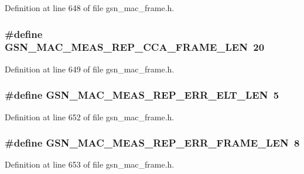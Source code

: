 Definition at line 648 of file gsn\_\-mac\_\-frame.h.

\hypertarget{a00523_ad28ce435f895e4eb008cbe50d0bd06f8}{
\subsubsection[{GSN\_\-MAC\_\-MEAS\_\-REP\_\-CCA\_\-FRAME\_\-LEN}]{\setlength{\rightskip}{0pt plus 5cm}\#define GSN\_\-MAC\_\-MEAS\_\-REP\_\-CCA\_\-FRAME\_\-LEN~20}}
\label{a00523_ad28ce435f895e4eb008cbe50d0bd06f8}


Definition at line 649 of file gsn\_\-mac\_\-frame.h.

\hypertarget{a00523_adc0de1bac500de6fa48e71a08ba5e4f8}{
\subsubsection[{GSN\_\-MAC\_\-MEAS\_\-REP\_\-ERR\_\-ELT\_\-LEN}]{\setlength{\rightskip}{0pt plus 5cm}\#define GSN\_\-MAC\_\-MEAS\_\-REP\_\-ERR\_\-ELT\_\-LEN~5}}
\label{a00523_adc0de1bac500de6fa48e71a08ba5e4f8}


Definition at line 652 of file gsn\_\-mac\_\-frame.h.

\hypertarget{a00523_a215aa0e7499b1a270f7a658da7a9fc27}{
\subsubsection[{GSN\_\-MAC\_\-MEAS\_\-REP\_\-ERR\_\-FRAME\_\-LEN}]{\setlength{\rightskip}{0pt plus 5cm}\#define GSN\_\-MAC\_\-MEAS\_\-REP\_\-ERR\_\-FRAME\_\-LEN~8}}
\label{a00523_a215aa0e7499b1a270f7a658da7a9fc27}


Definition at line 653 of file gsn\_\-mac\_\-frame.h.

